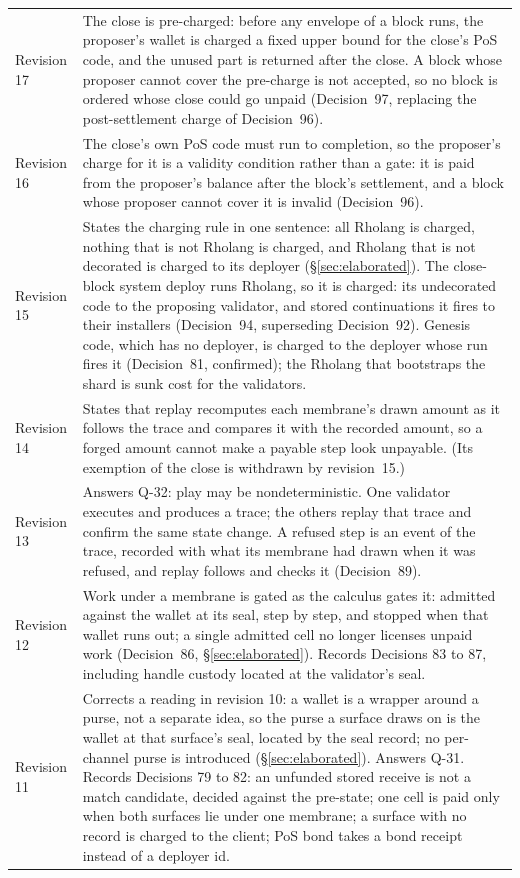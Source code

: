 \documentclass[11pt]{article}
\begin{document}
\begin{center}
\begin{tabular}{@{}lP{10.6cm}@{}}
Revision 17 & The close is pre-charged: before any envelope of a block runs, the proposer's wallet is charged a fixed upper bound for the close's PoS code, and the unused part is returned after the close. A block whose proposer cannot cover the pre-charge is not accepted, so no block is ordered whose close could go unpaid (Decision~97, replacing the post-settlement charge of Decision~96). \\
Revision 16 & The close's own PoS code must run to completion, so the proposer's charge for it is a validity condition rather than a gate: it is paid from the proposer's balance after the block's settlement, and a block whose proposer cannot cover it is invalid (Decision~96). \\
Revision 15 & States the charging rule in one sentence: all Rholang is charged, nothing that is not Rholang is charged, and Rholang that is not decorated is charged to its deployer (\S\ref{sec:elaborated}). The close-block system deploy runs Rholang, so it is charged: its undecorated code to the proposing validator, and stored continuations it fires to their installers (Decision~94, superseding Decision~92). Genesis code, which has no deployer, is charged to the deployer whose run fires it (Decision~81, confirmed); the Rholang that bootstraps the shard is sunk cost for the validators. \\
Revision 14 & States that replay recomputes each membrane's drawn amount as it follows the trace and compares it with the recorded amount, so a forged amount cannot make a payable step look unpayable. (Its exemption of the close is withdrawn by revision~15.) \\
Revision 13 & Answers Q-32: play may be nondeterministic. One validator executes and produces a trace; the others replay that trace and confirm the same state change. A refused step is an event of the trace, recorded with what its membrane had drawn when it was refused, and replay follows and checks it (Decision~89). \\
Revision 12 & Work under a membrane is gated as the calculus gates it: admitted against the wallet at its seal, step by step, and stopped when that wallet runs out; a single admitted cell no longer licenses unpaid work (Decision~86, \S\ref{sec:elaborated}). Records Decisions 83 to 87, including handle custody located at the validator's seal. \\
Revision 11 & Corrects a reading in revision 10: a wallet is a wrapper around a purse, not a separate idea, so the purse a surface draws on is the wallet at that surface's seal, located by the seal record; no per-channel purse is introduced (\S\ref{sec:elaborated}). Answers Q-31. Records Decisions 79 to 82: an unfunded stored receive is not a match candidate, decided against the pre-state; one cell is paid only when both surfaces lie under one membrane; a surface with no record is charged to the client; PoS bond takes a bond receipt instead of a deployer id. \\

\end{tabular}
\end{center}
\end{document}
